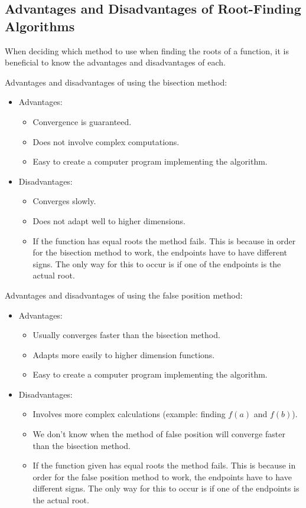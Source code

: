 \documentclass{article}
\begin{document}
\subsection {Advantages and Disadvantages of Root-Finding Algorithms}
When deciding which method to use when finding the roots of a function, it is beneficial to know the advantages and disadvantages of each.
\par\noindent Advantages and disadvantages of using the bisection method\cite{codeSansar}:
\begin{itemize}
    \item Advantages:
    \begin{itemize}
        \item Convergence is guaranteed.
        \item Does not involve complex computations.
        \item Easy to create a computer program implementing the algorithm.
    \end{itemize}
    \item Disadvantages:
    \begin{itemize}
        \item Converges slowly.
        \item Does not adapt well to higher dimensions.
        \item If the function has equal roots the method fails. This is because in order for the bisection method to work, the endpoints have to have different signs. The only way for this to occur is if one of the endpoints is the actual root.
    \end{itemize}
\end{itemize}

\noindent Advantages and disadvantages of using the false position method:
\begin{itemize}
    \item Advantages:
    \begin{itemize}
        \item Usually converges faster than the bisection method.
        \item Adapts more easily to higher dimension functions.
        \item Easy to create a computer program implementing the algorithm.
    \end{itemize}
    \item Disadvantages:
    \begin{itemize}
        \item Involves more complex calculations (example: finding $f(a)$ and $f(b)$).
        \item We don't know when the method of false position will converge faster than the bisection method.
        \item If the function given has equal roots the method fails. This is because in order for the false position method to work, the endpoints have to have different signs. The only way for this to occur is if one of the endpoints is the actual root.
    \end{itemize}
\end{itemize}
\end{document}
